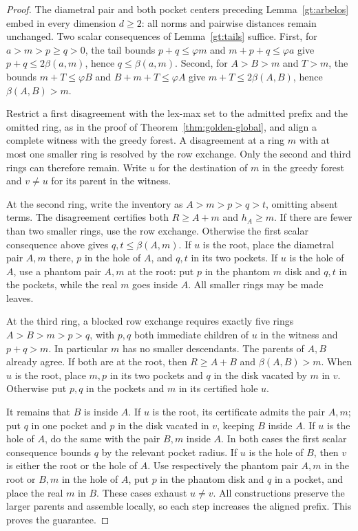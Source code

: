 \documentclass[11pt]{article}
\theoremstyle{definition}
\begin{document}
\begin{proof}
The diametral pair and both pocket centers preceding
Lemma~\ref{gt:arbelos} embed in every dimension $d\ge2$: all norms
and pairwise distances remain unchanged. Two scalar consequences of
Lemma~\ref{gt:tails} suffice. First, for $a>m>p\ge q>0$, the tail
bounds $p+q\le\varphi m$ and $m+p+q\le\varphi a$ give
$p+q\le2\beta(a,m)$, hence $q\le\beta(a,m)$. Second, for
$A>B>m$ and $T>m$, the bounds $m+T\le\varphi B$ and
$B+m+T\le\varphi A$ give $m+T\le2\beta(A,B)$, hence
$\beta(A,B)>m$.

Restrict a first disagreement with the lex-max set to the admitted
prefix and the omitted ring, as in the proof of
Theorem~\ref{thm:golden-global}, and align a complete witness with the
greedy forest. A disagreement at a ring $m$ with at most one smaller
ring is resolved by the row exchange. Only the second and third rings
can therefore remain. Write $u$ for the destination of $m$ in the
greedy forest and $v\ne u$ for its parent in the witness.

At the second ring, write the inventory as $A>m>p>q>t$, omitting
absent terms. The disagreement certifies both $R\ge A+m$ and
$h_A\ge m$. If there are fewer than two smaller rings, use the row
exchange. Otherwise the first scalar consequence above gives
$q,t\le\beta(A,m)$. If $u$ is the root, place the diametral pair
$A,m$ there, $p$ in the hole of $A$, and $q,t$ in its two pockets.
If $u$ is the hole of $A$, use a phantom pair $A,m$ at the root:
put $p$ in the phantom $m$ disk and $q,t$ in the pockets, while the
real $m$ goes inside $A$. All smaller rings may be made leaves.

At the third ring, a blocked row exchange requires exactly five
rings $A>B>m>p>q$, with $p,q$ both immediate children of $u$ in
the witness and $p+q>m$. In particular $m$ has no smaller descendants.
The parents of $A,B$ already agree. If both are at the root, then
$R\ge A+B$ and $\beta(A,B)>m$. When $u$ is the root, place $m,p$
in its two pockets and $q$ in the disk vacated by $m$ in $v$.
Otherwise put $p,q$ in the pockets and $m$ in its certified hole $u$.

It remains that $B$ is inside $A$. If $u$ is the root, its certificate
admits the pair $A,m$; put $q$ in one pocket and $p$ in the disk
vacated in $v$, keeping $B$ inside $A$. If $u$ is the hole of $A$,
do the same with the pair $B,m$ inside $A$. In both cases the first
scalar consequence bounds $q$ by the relevant pocket radius.
If $u$ is the hole of $B$, then $v$ is either the root or the hole
of $A$. Use respectively the phantom pair $A,m$ in the root or
$B,m$ in the hole of $A$, put $p$ in the phantom disk and $q$ in
a pocket, and place the real $m$ in $B$. These cases exhaust $u\ne v$.
All constructions preserve the larger parents and assemble locally,
so each step increases the aligned prefix. This proves the guarantee.


\end{proof}
\end{document}
